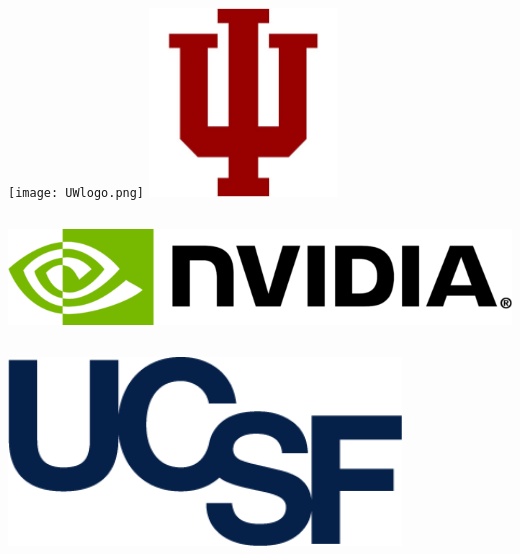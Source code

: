 \documentclass[a0, landscape]{a0poster}
\begin{document}
\begin{minipage}[b]{0.4\linewidth}

\texttt{[image: UWlogo.png]}
\includegraphics[height=5cm]{iulogo.jpeg}
\includegraphics[height=4cm]{Nvidia_logo.png}
\includegraphics[height=5cm]{UCSFlogo.png}


\end{minipage}

\vspace{0.5cm} %

\end{document}
